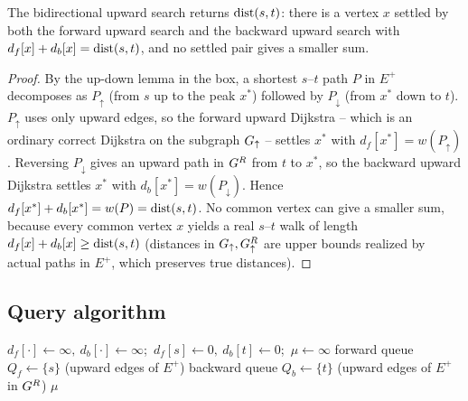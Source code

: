 \begin{theorem}
\label{ch08:thm-ch}
The bidirectional upward search returns $\operatorname{dist}(s,t)$: there is a vertex $x$
settled by both the forward upward search and the backward upward search with
$d_f[x]+d_b[x]=\operatorname{dist}(s,t)$, and no settled pair gives a smaller sum.
\end{theorem}
\begin{proof}
By the up-down lemma in the box, a shortest $s$--$t$ path
$P$ in $E^{+}$ decomposes as $P_\uparrow$ (from $s$ up to the peak $x^{*}$)
followed by $P_\downarrow$ (from $x^{*}$ down to $t$). $P_\uparrow$ uses only
upward edges, so the forward upward Dijkstra -- which is an ordinary correct
Dijkstra on the subgraph $G_\uparrow$ -- settles $x^{*}$ with
$d_f[x^{*}]=w(P_\uparrow)$. Reversing $P_\downarrow$ gives an upward path in
$G^{R}$ from $t$ to $x^{*}$, so the backward upward Dijkstra settles
$x^{*}$ with $d_b[x^{*}]=w(P_\downarrow)$. Hence $d_f[x^{*}]+d_b[x^{*}]=
w(P)=\operatorname{dist}(s,t)$. No common vertex can give a smaller sum, because every common
vertex $x$ yields a real $s$--$t$ walk of length $d_f[x]+d_b[x]\ge\operatorname{dist}(s,t)$
(distances in $G_\uparrow,G^R_\uparrow$ are upper bounds realized by actual
paths in $E^+$, which preserves true distances).
\end{proof}

\subsection{Query algorithm}

\begin{algorithm}[H]
\DontPrintSemicolon
{}
$d_f[\cdot]\gets\infty,\ d_b[\cdot]\gets\infty$;\ $d_f[s]\gets 0,\ d_b[t]\gets 0$;\ $\mu\gets\infty$\;
forward queue $Q_f\gets\{s\}$ (upward edges of $E^{+}$)\;
backward queue $Q_b\gets\{t\}$ (upward edges of $E^{+}$ in $G^{R}$)\;
\Return $\mu$\;
\caption{Contraction-hierarchy query}
\label{ch08:alg-ch}
\end{algorithm}

